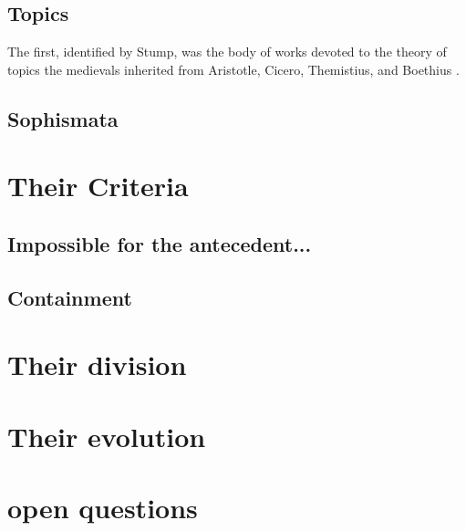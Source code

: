 \documentclass[]{article}
\begin{document}
\subsection{Topics}
The first, identified by Stump, was the body of works devoted to the theory of topics the medievals inherited from Aristotle, Cicero, Themistius, and Boethius \autocite{Stump1982}. 

\subsection{Sophismata}

\section{Their Criteria}

\subsection{Impossible for the antecedent...}

\subsection{Containment}

\section{Their division}


\section{Their evolution}

\section{open questions}

\printbibliography
\end{document}
